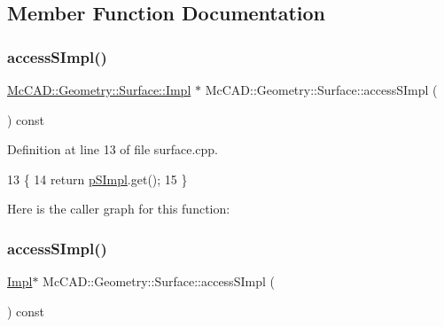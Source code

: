 \subsection{Member Function Documentation}
\mbox{\label{classMcCAD_1_1Geometry_1_1Surface_a989de1f9ebe3de043412014ed25e52eb}} 
\subsubsection{\texorpdfstring{access\+S\+Impl()}{accessSImpl()}\hspace{0.1cm}{\footnotesize\ttfamily [1/2]}}
{\footnotesize\ttfamily \hyperlink{classMcCAD_1_1Geometry_1_1Surface_1_1Impl}{Mc\+C\+A\+D\+::\+Geometry\+::\+Surface\+::\+Impl} $\ast$ Mc\+C\+A\+D\+::\+Geometry\+::\+Surface\+::access\+S\+Impl (\begin{DoxyParamCaption}{ }\end{DoxyParamCaption}) const}



Definition at line 13 of file surface.\+cpp.


\begin{DoxyCode}
13                                        \{
14   \textcolor{keywordflow}{return} \hyperlink{classMcCAD_1_1Geometry_1_1Surface_a0097d4e9bfc1c7cd7cd33d81492b9100}{pSImpl}.get();
15 \}
\end{DoxyCode}
Here is the caller graph for this function\+:
\mbox{\label{classMcCAD_1_1Geometry_1_1Surface_adafee834670eb8c97025e24ffd6df844}} 
\subsubsection{\texorpdfstring{access\+S\+Impl()}{accessSImpl()}\hspace{0.1cm}{\footnotesize\ttfamily [2/2]}}
{\footnotesize\ttfamily \hyperlink{classMcCAD_1_1Geometry_1_1Surface_1_1Impl}{Impl}$\ast$ Mc\+C\+A\+D\+::\+Geometry\+::\+Surface\+::access\+S\+Impl (\begin{DoxyParamCaption}{ }\end{DoxyParamCaption}) const}

